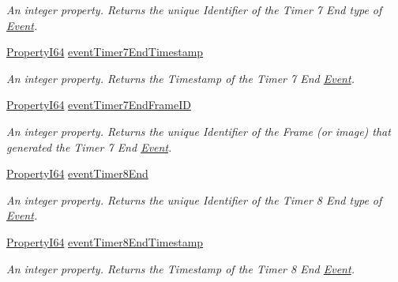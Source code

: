 \begin{DoxyCompactItemize}
\begin{DoxyCompactList}\small\item\em An integer property. Returns the unique Identifier of the Timer 7 End type of \hyperlink{classmv_i_m_p_a_c_t_1_1acquire_1_1_event}{Event}. \end{DoxyCompactList}\item 
\hyperlink{group___common_interface_ga81749b2696755513663492664a18a893}{Property\+I64} \hyperlink{classmv_i_m_p_a_c_t_1_1acquire_1_1_gen_i_cam_1_1_event_control_aa69ebc3ac27d93b4cd92f415de3add35}{event\+Timer7\+End\+Timestamp}
\begin{DoxyCompactList}\small\item\em An integer property. Returns the Timestamp of the Timer 7 End \hyperlink{classmv_i_m_p_a_c_t_1_1acquire_1_1_event}{Event}. \end{DoxyCompactList}\item 
\hyperlink{group___common_interface_ga81749b2696755513663492664a18a893}{Property\+I64} \hyperlink{classmv_i_m_p_a_c_t_1_1acquire_1_1_gen_i_cam_1_1_event_control_a0952872b43edc49b5d89cb1816dff03c}{event\+Timer7\+End\+Frame\+I\+D}
\begin{DoxyCompactList}\small\item\em An integer property. Returns the unique Identifier of the Frame (or image) that generated the Timer 7 End \hyperlink{classmv_i_m_p_a_c_t_1_1acquire_1_1_event}{Event}. \end{DoxyCompactList}\item 
\hyperlink{group___common_interface_ga81749b2696755513663492664a18a893}{Property\+I64} \hyperlink{classmv_i_m_p_a_c_t_1_1acquire_1_1_gen_i_cam_1_1_event_control_ac2ab73a7d716365793b261dbc85aa443}{event\+Timer8\+End}
\begin{DoxyCompactList}\small\item\em An integer property. Returns the unique Identifier of the Timer 8 End type of \hyperlink{classmv_i_m_p_a_c_t_1_1acquire_1_1_event}{Event}. \end{DoxyCompactList}\item 
\hyperlink{group___common_interface_ga81749b2696755513663492664a18a893}{Property\+I64} \hyperlink{classmv_i_m_p_a_c_t_1_1acquire_1_1_gen_i_cam_1_1_event_control_a9f9a719d858666dff7808b33f6da69ba}{event\+Timer8\+End\+Timestamp}
\begin{DoxyCompactList}\small\item\em An integer property. Returns the Timestamp of the Timer 8 End \hyperlink{classmv_i_m_p_a_c_t_1_1acquire_1_1_event}{Event}. \end{DoxyCompactList}\item 

\end{DoxyCompactItemize}
